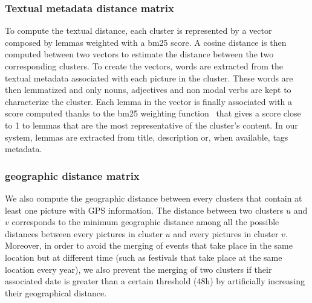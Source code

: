 \documentclass{acm_proc_article-me11_tweaked}
\begin{document}
\subsubsection{Textual metadata distance matrix}\label{text}
To compute the textual distance, each cluster is represented by a vector composed by lemmas weighted with a bm25 score. A cosine distance is then computed between two vectors to estimate the distance between the two corresponding clusters.
To create the vectors, words are extracted from the textual metadata associated with each picture in the cluster. These words are then lemmatized and only nouns, adjectives and non modal verbs are kept to characterize the cluster. Each lemma in the vector is finally associated with a score computed thanks to the bm25 weighting function~\cite{robertson1995okapi} that gives a score close to 1 to lemmas that are the most representative of the cluster's content.
In our system, lemmas are extracted from title, description or, when available, tags metadata.%

\subsubsection{geographic distance matrix}\label{geo}
We also compute the geographic distance between every clusters that contain at least one picture with GPS information. The distance between two clusters $u$ and $v$ corresponds to the minimum geographic distance among all the possible distances between every pictures in cluster $u$ and every pictures in cluster $v$. Moreover, in order to avoid the merging of events that take place in the same location but at different time (such as festivals that take place at the same location every year), we also prevent the merging of two clusters if their associated date is greater than a certain threshold (48h) by artificially increasing their geographical distance.
\end{document}
